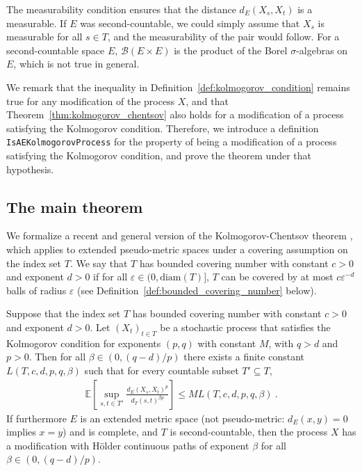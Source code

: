 \documentclass[lean]{Draft}
\begin{document}
The measurability condition ensures that the distance $d_E(X_s, X_t)$ is a measurable.
If $E$ was second-countable, we could simply assume that $X_s$ is measurable for all $s \in T$, and the measurability of the pair would follow.
For a second-countable space $E$, $\mathcal{B}(E \times E)$ is the product of the Borel $\sigma$-algebras on $E$, which is not true in general.

We remark that the inequality in Definition~\ref{def:kolmogorov_condition} remains true for any modification of the process $X$, and that Theorem~\ref{thm:kolmogorov_chentsov} also holds for a modification of a process satisfying the Kolmogorov condition.
Therefore, we introduce a definition \lstinline|IsAEKolmogorovProcess| for the property of being a modification of a process satisfying the Kolmogorov condition, and prove the theorem under that hypothesis.


\subsection{The main theorem}

We formalize a recent and general version of the Kolmogorov-Chentsov theorem \cite[Theorem 1]{kratschmer2023kolmogorov}, which applies to extended pseudo-metric spaces under a covering assumption on the index set $T$.
We say that $T$ has bounded covering number with constant $c > 0$ and exponent $d > 0$ if for all $\varepsilon \in (0, \mathrm{diam}(T)]$, $T$ can be covered by at most $c \varepsilon^{-d}$ balls of radius $\varepsilon$ (see Definition~\ref{def:bounded_covering_number} below).

\begin{theorem}\label{thm:kolmogorov_chentsov}
Suppose that the index set $T$ has bounded covering number with constant $c>0$ and exponent $d > 0$.
Let $(X_t)_{t \in T}$ be a stochastic process that satisfies the Kolmogorov condition for exponents $(p,q)$ with constant $M$, with $q > d$ and $p > 0$.
Then for all $\beta \in(0, (q - d)/p)$ there exists a finite constant $L(T, c, d, p, q, \beta)$ such that for every countable subset $T' \subseteq T$,
\begin{align*}
  \mathbb{E}\left[ \sup_{s, t \in T'} \frac{d_E(X_s, X_t)^p}{d_T(s, t)^{\beta p}} \right]
  \le M L(T, c, d, p, q, \beta)
  \: .
\end{align*}
If furthermore $E$ is an extended metric space (not pseudo-metric: $d_E(x,y) = 0$ implies $x = y$) and is complete, and $T$ is second-countable, then the process $X$ has a modification with Hölder continuous paths of exponent $\beta$ for all $\beta \in (0, (q - d)/p)$.
\end{theorem}
\end{document}
